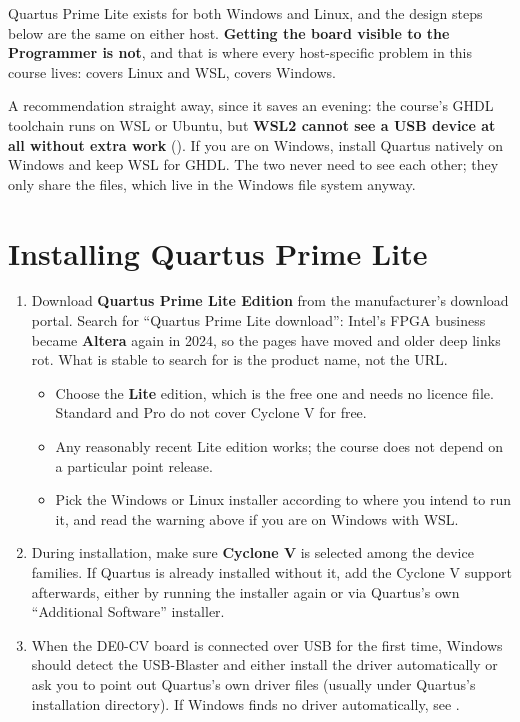 Quartus Prime Lite exists for both Windows and Linux, and the design steps below are the same on
either host. \textbf{Getting the board visible to the Programmer is not}, and that is where every
host-specific problem in this course lives:  covers Linux and WSL,
 covers Windows.

\begin{warning}
A recommendation straight away, since it saves an evening: the course's GHDL toolchain runs on WSL or
Ubuntu, but \textbf{WSL2 cannot see a USB device at all without extra work}
(). If you are on Windows, install Quartus natively on Windows and keep WSL
for GHDL. The two never need to see each other; they only share the  files, which live in
the Windows file system anyway.
\end{warning}

\section{Installing Quartus Prime Lite}
\label{app:quartus:install}

\begin{enumerate}
  \item Download \textbf{Quartus Prime Lite Edition} from the manufacturer's download portal. Search
    for ``Quartus Prime Lite download'': Intel's FPGA business became \textbf{Altera} again in 2024,
    so the pages have moved and older deep links rot. What is stable to search for is the product
    name, not the URL.
    \begin{itemize}
      \item Choose the \textbf{Lite} edition, which is the free one and needs no licence file.
        Standard and Pro do not cover Cyclone V for free.
      \item Any reasonably recent Lite edition works; the course does not depend on a particular
        point release.
      \item Pick the Windows or Linux installer according to where you intend to run it, and read the
        warning above if you are on Windows with WSL.
    \end{itemize}
  \item During installation, make sure \textbf{Cyclone V} is selected among the device families. If
    Quartus is already installed without it, add the Cyclone V support afterwards, either by running
    the installer again or via Quartus's own ``Additional Software'' installer.
  \item When the DE0-CV board is connected over USB for the first time, Windows should detect the
    USB-Blaster and either install the driver automatically or ask you to point out Quartus's own
    driver files (usually under Quartus's installation directory). If Windows finds no driver
    automatically, see .
\end{enumerate}


